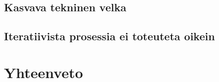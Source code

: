 \documentclass[a4paper]{article}
\begin{document}
\subsection{Kasvava tekninen velka}

\subsection{Iteratiivista prosessia ei toteuteta oikein}

\section{Yhteenveto}
\end{document}
